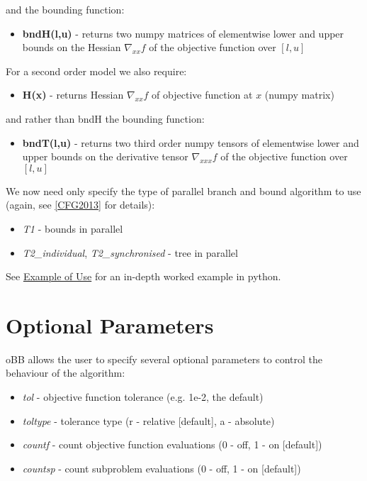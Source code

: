 \documentclass[letterpaper,11pt,openany,oneside]{sphinxmanual}
\begin{document}
and the bounding function:
\begin{itemize}
\item {} 
\textbf{bndH(l,u)} - returns two numpy matrices of elementwise lower and upper bounds on the Hessian $\nabla_{xx} f$ of the objective function over $[l,u]$

\end{itemize}

For a second order model we also require:
\begin{itemize}
\item {} 
\textbf{H(x)} - returns Hessian $\nabla_{xx} f$ of objective function at $x$ (numpy matrix)

\end{itemize}

and rather than bndH the bounding function:
\begin{itemize}
\item {} 
\textbf{bndT(l,u)} - returns two third order numpy tensors of elementwise lower and upper bounds on the derivative tensor $\nabla_{xxx} f$ of the objective function over $[l,u]$

\end{itemize}

We now need only specify the type of parallel branch and bound algorithm to use (again, see {\hyperref[userguide:cfg2013]{{[}CFG2013{]}}} for details):
\begin{itemize}
\item {} 
\emph{T1} - bounds in parallel

\item {} 
\emph{T2\_individual}, \emph{T2\_synchronised} - tree in parallel

\end{itemize}

See {\hyperref[userguide:example-of-use]{Example of Use}} for an in-depth worked example in python.


\section{Optional Parameters}
\label{userguide:optional-parameters}
oBB allows the user to specify several optional parameters to control the behaviour of the algorithm:
\begin{itemize}
\item {} 
\emph{tol} - objective function tolerance (e.g. 1e-2, the default)

\item {} 
\emph{toltype} - tolerance type (r - relative {[}default{]}, a - absolute)

\item {} 
\emph{countf} - count objective function evaluations (0 - off, 1 - on {[}default{]})

\item {} 
\emph{countsp} - count subproblem evaluations (0 - off, 1 - on {[}default{]})

\end{itemize}
\end{document}
